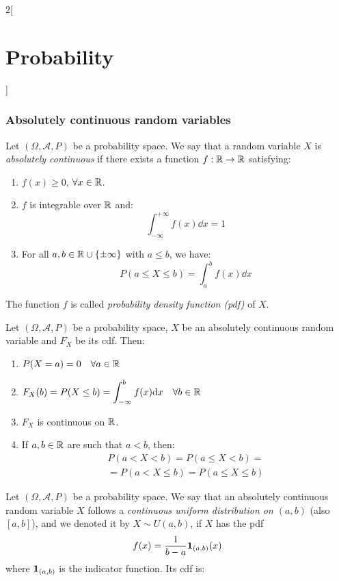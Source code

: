 \documentclass[../../../main.tex]{subfiles}
\begin{document}
\begin{multicols}{2}[\section{Probability}]
  \subsubsection*{Absolutely continuous random variables}
  \begin{definition}
    Let $(\Omega,\mathcal{A},P)$ be a probability space. We say that a random variable $X$ is \textit{absolutely continuous} if there exists a function $f:\mathbb{R}\rightarrow\mathbb{R}$ satisfying:
    \begin{enumerate}
      \item $f(x)\geq 0$, $\forall x\in\mathbb{R}$.
      \item $f$ is integrable over $\mathbb{R}$ and: $$\int_{-\infty}^{+\infty}f(x)\dd x=1$$
      \item For all $a,b\in\mathbb{R}\cup\{\pm\infty\}$ with $a\leq b$, we have: $$P(a\leq X\leq b)=\int_a^bf(x)\dd x$$
    \end{enumerate}
    The function $f$ is called \textit{probability density function (pdf)} of $X$.
  \end{definition}
  \begin{prop}
    Let $(\Omega,\mathcal{A},P)$ be a probability space, $X$ be an absolutely continuous random variable and $F_X$ be its cdf. Then:
    \begin{enumerate}
      \item $P(X=a)=0\quad\forall a\in \mathbb{R}$
      \item $\displaystyle F_X(b)=P(X\leq b)=\int_{-\infty}^bf(x)\dd x\quad\forall b\in\mathbb{R}$
      \item $F_X$ is continuous on $\mathbb{R}$.
      \item If $a,b\in\mathbb{R}$ are such that $a<b$, then:
            \begin{multline*}
              P(a<X<b)=P(a\leq X<b)=\\=P(a<X\leq b)=P(a\leq X\leq b)
            \end{multline*}
    \end{enumerate}
  \end{prop}
  \begin{definition}
    Let $(\Omega,\mathcal{A},P)$ be a probability space. We say that an absolutely continuous random variable $X$ follows a \textit{continuous uniform distribution on $(a,b)$} (also $[a,b]$), and we denoted it by $X\sim U(a,b)$, if $X$ has the pdf $$f(x)=\frac{1}{b-a}\boldsymbol{\mathrm{1}}_{(a,b)}(x)$$ where $\boldsymbol{\mathrm{1}}_{(a,b)}$ is the indicator function. Its cdf is:
    \begin{multline*}

\end{multline*}
\end{definition}
\end{multicols}
\end{document}
